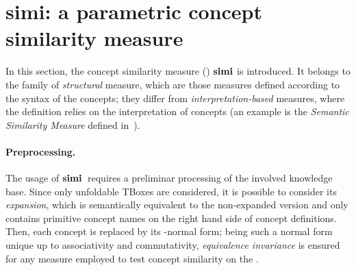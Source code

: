 \section{simi: a parametric concept similarity measure}
\label{sec:simi}

In this section, the concept similarity measure (\csm) \(\operatorname{\mathbf{simi}}\) is introduced.
It belongs to the family of \emph{structural} measure, which are those measures defined according to the syntax of the concepts; they differ from \emph{interpretation-based} measures, where the definition relies on the interpretation of concepts (an example is the \emph{Semantic Similarity Measure} defined in~\cite{SemSim}).

  \paragraph{Preprocessing.}
  The usage of \(\operatorname{\mathbf{simi}}{}\) requires a preliminar processing of the involved knowledge base.
  Since only unfoldable TBoxes are considered, it is possible to consider its \emph{expansion}, which is semantically equivalent to the non-expanded version and only contains primitive concept names on the right hand side of concept definitions.
  Then, each concept is replaced by its \elh-normal form; being such a normal form unique up to associativity and commutativity, \emph{equivalence invariance} is ensured for any measure employed to test concept similarity on the \kb.

